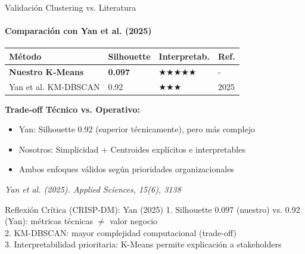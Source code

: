 \documentclass[10pt]{beamer}
\begin{document}
\begin{frame}{Validación Clustering vs. Literatura}
\framesubtitle{Comparación con Yan et al. (2025)}

\begin{table}
\centering
\small
\begin{tabular}{llll}
\toprule
\textbf{Método} & \textbf{Silhouette} & \textbf{Interpretab.} & \textbf{Ref.} \\
\midrule
\textbf{Nuestro K-Means} & \textbf{0.097} & $\bigstar\bigstar\bigstar\bigstar\bigstar$ & - \\
Yan et al. KM-DBSCAN & 0.92 & $\bigstar\bigstar\bigstar$ & 2025 \\
\bottomrule
\end{tabular}
\end{table}

\textbf{Trade-off Técnico vs. Operativo:}
\begin{itemize}
    \item Yan: Silhouette 0.92 (superior técnicamente), pero más complejo
    \item Nosotros: Simplicidad + Centroides explícitos e interpretables
    \item Ambos enfoques válidos según prioridades organizacionales
\end{itemize}

\tiny \textit{Yan et al. (2025). Applied Sciences, 15(6), 3138}

\vspace{0.2cm}
\begin{alertblock}{Reflexión Crítica (CRISP-DM): Yan (2025)}
\small
1. Silhouette 0.097 (nuestro) vs. 0.92 (Yan): métricas técnicas $\neq$ valor negocio\\
2. KM-DBSCAN: mayor complejidad computacional (trade-off)\\
3. Interpretabilidad prioritaria: K-Means permite explicación a stakeholders
\end{alertblock}
\end{frame}
\end{document}

